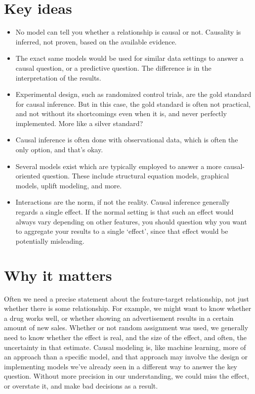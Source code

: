 \documentclass[
  letterpaper,
]{krantz}
\providecommand{\tightlist}{%
  \setlength{\itemsep}{0pt}\setlength{\parskip}{0pt}}\usepackage{longtable,booktabs,array}
\begin{document}
\section{Key ideas}\label{key-ideas-5}

\begin{itemize}
\tightlist
\item
  No model can tell you whether a relationship is causal or not.
  Causality is inferred, not proven, based on the available evidence.
\item
  The exact same models would be used for similar data settings to
  answer a causal question, or a predictive question. The difference is
  in the interpretation of the results.
\item
  Experimental design, such as randomized control trials, are the gold
  standard for causal inference. But in this case, the gold standard is
  often not practical, and not without its shortcomings even when it is,
  and never perfectly implemented. More like a silver standard?
\item
  Causal inference is often done with observational data, which is often
  the only option, and that's okay.
\item
  Several models exist which are typically employed to answer a more
  causal-oriented question. These include structural equation models,
  graphical models, uplift modeling, and more.
\item
  Interactions are the norm, if not the reality. Causal inference
  generally regards a single effect. If the normal setting is that such
  an effect would always vary depending on other features, you should
  question why you want to aggregate your results to a single `effect',
  since that effect would be potentially misleading.
\end{itemize}

\section{Why it matters}\label{why-it-matters}

Often we need a precise statement about the feature-target relationship,
not just whether there is some relationship. For example, we might want
to know whether a drug works well, or whether showing an advertisement
results in a certain amount of new sales. Whether or not random
assignment was used, we generally need to know whether the effect is
real, and the size of the effect, and often, the uncertainty in that
estimate. Causal modeling is, like machine learning, more of an approach
than a specific model, and that approach may involve the design or
implementing models we've already seen in a different way to answer the
key question. Without more precision in our understanding, we could miss
the effect, or overstate it, and make bad decisions as a result.
\end{document}
